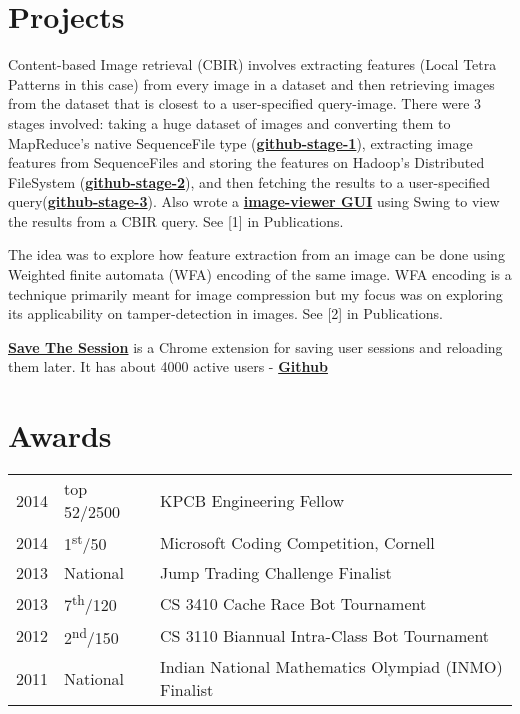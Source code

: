 \documentclass[]{deedy-resume-openfont}
\begin{document}
\begin{minipage}[t]{0.66\textwidth}
\section{Projects}
\descript{}
Content-based Image retrieval (CBIR) involves extracting features (Local Tetra Patterns in this case) from every image in a dataset and then retrieving images from the dataset that is closest to a user-specified query-image.
There were 3 stages involved: taking a huge dataset of images and converting them to MapReduce's native SequenceFile type (\textbf{\href{https://github.com/sg1993/sequencify-CBIR-on-hadoop}{github-stage-1}}), extracting image features from SequenceFiles and storing the features on Hadoop's Distributed FileSystem (\textbf{\href{https://github.com/sg1993/CBIR-on-Hadoop}{github-stage-2}}), and then fetching the results to a user-specified query(\textbf{\href{https://github.com/sg1993/CBIR-query-on-Hadoop}{github-stage-3}}). Also wrote a \textbf{\href{https://github.com/sg1993/CBIR-query-Image-Viewer}{image-viewer GUI}} using Swing to view the results from a CBIR query. See [1] in Publications.
\sectionsep

\descript{}
The idea was to explore how feature extraction from an image can be done using Weighted finite automata (WFA) encoding of the same image. WFA encoding is a technique primarily meant for image compression but my focus was on exploring its applicability on tamper-detection in images. See [2] in Publications.
\sectionsep

\descript{}
\textbf{\href{https://chrome.google.com/webstore/detail/save-the-session/gfokkgedgncpmhnbomipnbnpkedjpbil}{Save The Session}} is a Chrome extension for saving user sessions and reloading them later. It has about 4000 active users \enspace - \enspace 
{\textbf{\href{https://github.com/sg1993/Save-The-Session}{Github}}}
\sectionsep


\section{Awards} 
\begin{tabular}{rll}
2014	     & top 52/2500  & KPCB Engineering Fellow\\
2014	     & 1\textsuperscript{st}/50  & Microsoft Coding Competition, Cornell\\
2013	     & National  & Jump Trading Challenge Finalist\\
2013     & 7\textsuperscript{th}/120 & CS 3410 Cache Race Bot Tournament  \\
2012     & 2\textsuperscript{nd}/150 & CS 3110 Biannual Intra-Class Bot Tournament \\
2011     & National & Indian National Mathematics Olympiad (INMO) Finalist \\
\end{tabular}
\sectionsep

\end{minipage} 
\end{document}
